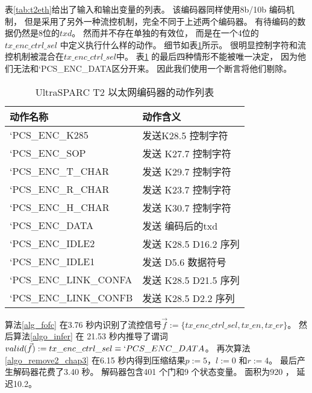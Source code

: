 表\ref{tab:t2eth}给出了输入和输出变量的列表。
该编码器同样使用8b/10b 编码机制，
但是采用了另外一种流控机制，完全不同于上述两个编码器。
有待编码的数据仍然是8位的$txd$。
然而并不存在单独的有效位，
而是在一个4位的$tx\_enc\_ctrl\_sel$ 中定义执行什么样的动作。
细节如表\ref{tab:one}所示。
很明显控制字符和流控机制被混合在$tx\_enc\_ctrl\_sel$中。
表\ref{tab:one} 的最后四种情形不能被唯一决定，
因为他们无法和`PCS\_ENC\_DATA区分开来。
因此我们使用一个断言将他们剔除。

\begin{table}[t]%
\caption{UltraSPARC T2 以太网编码器的动作列表}
\label{tab:one}
\centering
\begin{tabular}{|l|l|}
\hline
动作名称          & 动作含义\\\hline\hline
`PCS\_ENC\_K285   & 发送K28.5 控制字符\\\hline
`PCS\_ENC\_SOP  & 发送 K27.7 控制字符\\\hline
`PCS\_ENC\_T\_CHAR    & 发送 K29.7 控制字符\\\hline
`PCS\_ENC\_R\_CHAR   & 发送 K23.7 控制字符\\\hline
`PCS\_ENC\_H\_CHAR     & 发送 K30.7 控制字符\\\hline
`PCS\_ENC\_DATA     & 发送 编码后的txd\\\hline
`PCS\_ENC\_IDLE2     & 发送 K28.5 D16.2 序列\\\hline
`PCS\_ENC\_IDLE1       & 发送 D5.6 数据符号\\\hline
`PCS\_ENC\_LINK\_CONFA & 发送  K28.5 D21.5 序列\\\hline
`PCS\_ENC\_LINK\_CONFB     & 发送 K28.5 D2.2 序列\\\hline
\end{tabular}
\end{table}%

算法\ref{alg_fofc} 在3.76 秒内识别了流控信号$\vec{f}:=\{tx\_enc\_ctrl\_sel,tx\_en, tx\_er\}$。
然后算法\ref{algo_infer} 在 21.53 秒内推导了谓词$valid(\vec{f}):=tx\_enc\_ctrl\_sel\equiv `PCS\_ENC\_DATA$。
再次算法\ref{algo_remove2_chap3} 在6.15 秒内得到压缩结果$p:=5$，$l:=0$ 和$r:=4$。
最后产生解码器花费了3.40 秒。
解码器包含401 个门和9 个状态变量。
面积为920 ，
延迟10.2。

